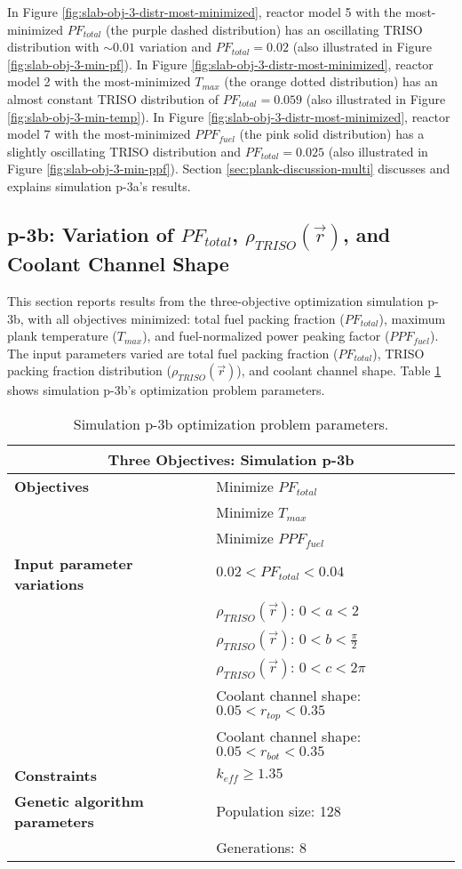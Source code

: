 In Figure \ref{fig:slab-obj-3-distr-most-minimized}, reactor model 5 with the
most-minimized $PF_{total}$ (the purple dashed distribution) has an oscillating TRISO 
distribution with $\sim0.01$ variation and $PF_{total} = 0.02$ 
(also illustrated in Figure \ref{fig:slab-obj-3-min-pf}).
In Figure \ref{fig:slab-obj-3-distr-most-minimized}, reactor model 2 with the 
most-minimized $T_{max}$ (the orange dotted distribution) has an almost constant TRISO 
distribution of $PF_{total}=0.059$ (also illustrated in Figure 
\ref{fig:slab-obj-3-min-temp}). 
In Figure \ref{fig:slab-obj-3-distr-most-minimized}, reactor model 7 with the
most-minimized $PPF_{fuel}$ (the pink solid distribution) has a 
slightly oscillating TRISO distribution and $PF_{total} = 0.025$ 
(also illustrated in Figure \ref{fig:slab-obj-3-min-ppf}).
Section \ref{sec:plank-discussion-multi} discusses and explains simulation p-3a's results.

\subsection{p-3b: Variation of $PF_{total}$, $\rho_{TRISO}(\vec{r})$, and Coolant 
Channel Shape}
\label{sec:p-3b}
This section reports results from the three-objective optimization simulation p-3b, 
with all objectives minimized: total fuel packing fraction ($PF_{total}$), maximum plank 
temperature ($T_{max}$), and fuel-normalized power peaking factor ($PPF_{fuel}$).  
The input parameters varied are total fuel packing fraction ($PF_{total}$), 
TRISO packing fraction distribution ($\rho_{TRISO}(\vec{r})$), and coolant channel 
shape.  
Table \ref{tab:simulationp3b} shows simulation p-3b's optimization problem parameters. 
\begin{table}[htbp!]
    \centering
    \onehalfspacing
    \caption{Simulation p-3b optimization problem parameters.}
	\label{tab:simulationp3b}
    \footnotesize
    \begin{tabular}{l|p{6.5cm}}
    \hline 
    \multicolumn{2}{c}{\textbf{Three Objectives: Simulation p-3b}} \\
    \hline 
    \textbf{Objectives} & Minimize $PF_{total}$ \\
    & Minimize $T_{max}$ \\
    & Minimize $PPF_{fuel}$ \\
    \hline 
    \textbf{Input parameter variations} & $0.02<PF_{total}<0.04$ \\
    & $\rho_{TRISO}(\vec{r})$: $0<a<2$ \\
    & $\rho_{TRISO}(\vec{r})$: $0<b<\frac{\pi}{2}$ \\
    & $\rho_{TRISO}(\vec{r})$: $0<c<2\pi$ \\
    & Coolant channel shape: $0.05<r_{top}<0.35$ \\
    & Coolant channel shape: $0.05<r_{bot}<0.35$ \\
    \hline
    \textbf{Constraints} & $k_{eff} \geq 1.35$\\ 
    \hline 
    \textbf{Genetic algorithm parameters} & Population size: 128 \\
    & Generations: 8 \\
    \hline
    \end{tabular}
\end{table}

